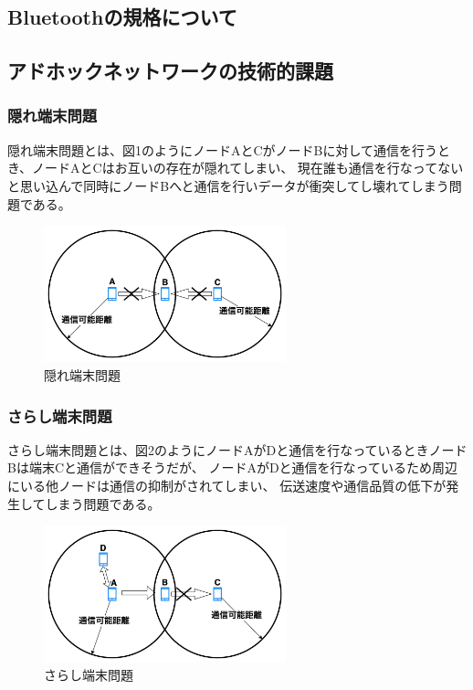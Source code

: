 \documentclass[a4paper, 11pt]{ltjsarticle}
\begin{document}
\subsection{Bluetoothの規格について}
\subsection{アドホックネットワークの技術的課題}
\subsubsection{隠れ端末問題}
隠れ端末問題とは、図1のようにノードAとCがノードBに対して通信を行うとき、ノードAとCはお互いの存在が隠れてしまい、
現在誰も通信を行なってないと思い込んで同時にノードBへと通信を行いデータが衝突してし壊れてしまう問題である。%
\begin{figure}[H]
  \centering
  \includegraphics[width=70mm]{hidden_terminal_problem.png}
  \caption{隠れ端末問題}
\end{figure}

\subsubsection{さらし端末問題}
さらし端末問題\cite{人口密度}とは、図2のようにノードAがDと通信を行なっているときノードBは端末Cと通信ができそうだが、
ノードAがDと通信を行なっているため周辺にいる他ノードは通信の抑制がされてしまい、
伝送速度や通信品質の低下が発生してしまう問題である。%
\begin{figure}[H]
  \centering
  \includegraphics[width=70mm]{exposed_terminal_problem.png}
  \caption{さらし端末問題}
\end{figure}

\clearpage
\end{document}
